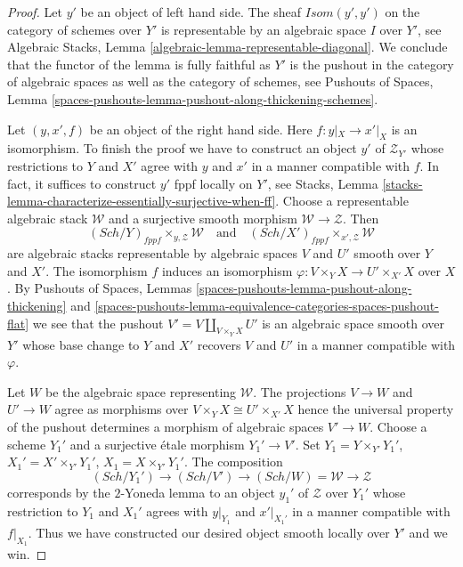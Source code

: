 \documentclass{stacks-project}
\theoremstyle{plain}
\theoremstyle{definition}
\theoremstyle{remark}
\numberwithin{equation}{subsection}
\def\Sch{\mathit{Sch}}
\begin{document}
\begin{proof}
Let $y'$ be an object of left hand side. The sheaf
$\mathit{Isom}(y', y')$ on the category of schemes over $Y'$
is representable by an algebraic space $I$ over $Y'$, see
Algebraic Stacks, Lemma \ref{algebraic-lemma-representable-diagonal}.
We conclude that the functor of the lemma is fully faithful as
$Y'$ is the pushout in the category of algebraic spaces as
well as the category of schemes, see
Pushouts of Spaces, Lemma
\ref{spaces-pushouts-lemma-pushout-along-thickening-schemes}.

\medskip\noindent
Let $(y, x', f)$ be an object of the right hand side. Here $f : y|_X \to x'|_X$
is an isomorphism. To finish the proof we have to construct an object $y'$ of
$\mathcal{Z}_{Y'}$ whose restrictions to $Y$ and $X'$ agree with $y$ and $x'$
in a manner compatible with $f$. In fact, it suffices to construct $y'$
fppf locally on $Y'$, see
Stacks, Lemma \ref{stacks-lemma-characterize-essentially-surjective-when-ff}.
Choose a representable algebraic stack
$\mathcal{W}$ and a surjective smooth morphism $\mathcal{W} \to \mathcal{Z}$.
Then
$$
(\Sch/Y)_{fppf} \times_{y, \mathcal{Z}} \mathcal{W}
\quad\text{and}\quad
(\Sch/X')_{fppf} \times_{x', \mathcal{Z}} \mathcal{W}
$$
are algebraic stacks representable by algebraic spaces $V$ and $U'$
smooth over $Y$ and $X'$. The isomorphism $f$ induces an isomorphism
$\varphi : V \times_Y X \to U' \times_{X'} X$ over $X$. By
Pushouts of Spaces, Lemmas
\ref{spaces-pushouts-lemma-pushout-along-thickening} and
\ref{spaces-pushouts-lemma-equivalence-categories-spaces-pushout-flat}
we see that the pushout $V' = V \amalg_{V \times_Y X} U'$ is
an algebraic space smooth over $Y'$ whose base change to
$Y$ and $X'$ recovers $V$ and $U'$ in a manner compatible with $\varphi$.

\medskip\noindent
Let $W$ be the algebraic space representing $\mathcal{W}$.
The projections $V \to W$ and $U' \to W$ agree as morphisms
over $V \times_Y X \cong U' \times_{X'} X$ hence the universal
property of the pushout determines a morphism of algebraic spaces
$V' \to W$. Choose a scheme $Y_1'$ and a surjective \'etale morphism
$Y_1' \to V'$. Set $Y_1 = Y \times_{Y'} Y_1'$,
$X_1' = X' \times_{Y'} Y_1'$, $X_1 = X \times_{Y'} Y_1'$.
The composition
$$
(\Sch/Y_1') \to (\Sch/V') \to (\Sch/W) = \mathcal{W} \to \mathcal{Z}
$$
corresponds by the $2$-Yoneda lemma to an object $y_1'$ of $\mathcal{Z}$
over $Y_1'$ whose restriction to $Y_1$ and $X_1'$ agrees with $y|_{Y_1}$
and $x'|_{X_1'}$ in a manner compatible with $f|_{X_1}$. Thus we have
constructed our desired object smooth locally over $Y'$ and we win.
\end{proof}
\end{document}
